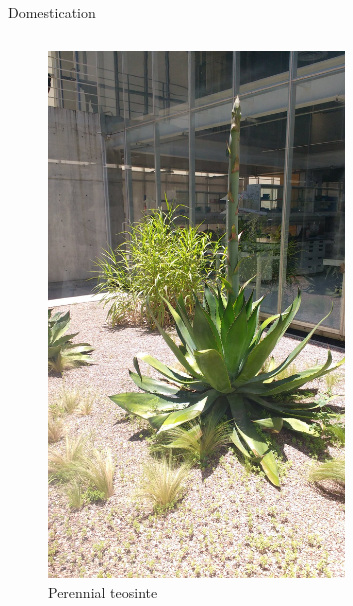 \documentclass[11pt,ignorenonframetext,aspectratio=169]{beamer}
\begin{document}
\begin{frame}{Domestication}
\begin{columns}[T,onlytextwidth]
\begin{figure}
{\centering \includegraphics[width=0.7\textwidth, keepaspectratio,height=0.92\textheight]{./images/Perennial_teosinte} 

}

\caption{Perennial teosinte}\label{fig:weed-vs-crop}
\end{figure}

\end{columns}
\end{frame}
\end{document}
